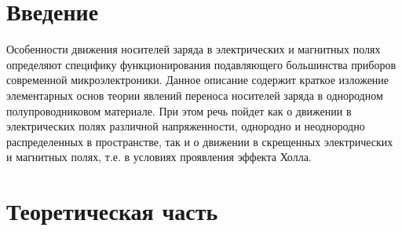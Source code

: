 \documentclass[a4paper,14pt]{extarticle}
\renewcommand{\vec}{\mathbf} %
\begin{document}
\section*{Введение}
	Особенности движения носителей заряда в электрических и магнитных
полях определяют специфику функционирования подавляющего большинства
приборов современной микроэлектроники. Данное описание содержит краткое
изложение элементарных основ теории явлений переноса носителей заряда в 
однородном полупроводниковом материале. При этом речь пойдет как о движении
в электрических полях различной напряженности, однородно и неоднородно
распределенных в пространстве, так и о движении в скрещенных электрических
и магнитных полях, т.е. в условиях проявления эффекта Холла.



\section{Теоретическая часть}




\end{document}
